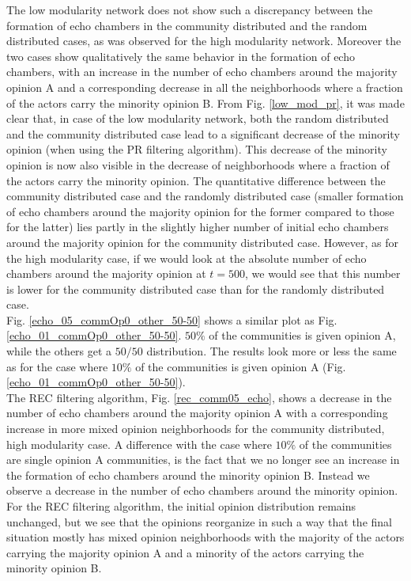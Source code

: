 \documentclass[11 pt , letterpaper , twoside , openright]{book}
\begin{document}
The low modularity network does not show such a discrepancy between the formation of echo chambers in the community distributed and the random distributed cases, as was observed for the high modularity network. Moreover the two cases show qualitatively the same behavior in the formation of echo chambers, with an increase in the number of echo chambers around the majority opinion A and a corresponding decrease in all the neighborhoods where a fraction of the actors carry the minority opinion B. From Fig. \ref{low_mod_pr}, it was made clear that, in case of the low modularity network, both the random distributed and the community distributed case lead to a significant decrease of the minority opinion (when using the PR filtering algorithm). This decrease of the minority opinion is now also visible in the decrease of neighborhoods where a fraction of the actors carry the minority opinion. The quantitative difference between the community distributed case and the randomly distributed case (smaller formation of echo chambers around the majority opinion for the former compared to those for the latter) lies partly in the slightly higher number of initial echo chambers around the majority opinion for the community distributed case. However, as for the high modularity case, if we would look at the absolute number of echo chambers around the majority opinion at $t=500$, we would see that this number is lower for the community distributed case than for the randomly distributed case. %
\\
\newline
Fig. \ref{echo_05_commOp0_other_50-50} shows a similar plot as Fig. \ref{echo_01_commOp0_other_50-50}. $50 \%$ of the communities is given opinion A, while the others get a $50/50$ distribution. The results look more or less the same as for the case where $10 \%$ of the communities is given opinion A (Fig. \ref{echo_01_commOp0_other_50-50}).\\
\newline
The REC filtering algorithm, Fig. \ref{rec_comm05_echo}, shows a decrease in the number of echo chambers around the majority opinion A with a corresponding increase in more mixed opinion neighborhoods for the community distributed, high modularity case. A difference with the case where $10 \%$ of the communities are single opinion A communities, is the fact that we no longer see an increase in the formation of echo chambers around the minority opinion B. Instead we observe a decrease in the number of echo chambers around the minority opinion. For the REC filtering algorithm, the initial opinion distribution remains unchanged, but we see that the opinions reorganize in such a way that the final situation mostly has mixed opinion neighborhoods with the majority of the actors carrying the majority opinion A and a minority of the actors carrying the minority opinion B. \\
\end{document}
